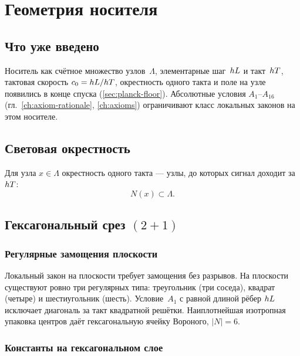\chapter{Геометрия носителя}
\label{ch:carrier}

\section{Что уже введено}
\label{sec:carrier-motivation}

Носитель как счётное множество узлов~$\Lambda$, элементарные шаг~$hL$ и такт~$hT$,
тактовая скорость $c_0=hL/hT$, окрестность одного такта и поле на узле
появились в конце спуска (\cref{sec:planck-floor}).
Абсолютные условия $A_1$--$A_{16}$ (гл.~\ref{ch:axiom-rationale}, \ref{ch:axioms})
ограничивают класс локальных законов на этом носителе.

\section{Световая окрестность}
\label{sec:epsilon}

\begin{definition}
\label{def:epsilon}
Для узла $x\in\Lambda$ окрестность одного такта --- узлы, до которых сигнал доходит за~$hT$:
\[
  N(x)\subset\Lambda.
\]
\end{definition}

\section{Гексагональный срез $(2{+}1)$}
\label{sec:hex-slice}

\subsection{Регулярные замощения плоскости}

Локальный закон на плоскости требует замощения без разрывов.
На плоскости существуют ровно три регулярных типа: треугольник (три соседа),
квадрат (четыре) и шестиугольник (шесть).
Условие~$A_1$ с равной длиной рёбер $hL$ исключает диагональ за такт квадратной решётки.
Наиплотнейшая изотропная упаковка центров даёт гексагональную ячейку Вороного, $|N|=6$.

\subsection{Константы на гексагональном слое}

